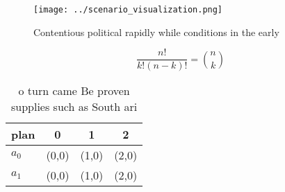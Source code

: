 \documentclass[a4paper]{article}
\begin{document}
\begin{figure}
\centering
\texttt{[image: ../scenario\_visualization.png]}
\caption{Contentious political rapidly while conditions in the early
}
\end{figure}
 
\[ \frac{n!}{k!(n-k)!} = \binom{n}{k} \]

\begin{table}
\begin{adjustbox}{width=0.6\columnwidth}
\begin{tabular}{|l|l|l|l|}
\hline
\textbf{plan} & \multicolumn{1}{c|}{\textbf{0}} & \multicolumn{1}{c|}{\textbf{1}} & \multicolumn{1}{c|}{\textbf{2}} \\ \hline
\textbf{$a_0$}  & (0,0) & (1,0) & (2,0) \\ \hline
\textbf{$a_1$}  & (0,0) & (1,0) & (2,0) \\ \hline
\end{tabular}
\end{adjustbox}
\caption{ o turn came Be proven supplies such as South ari
}
\end{table}
\end{document}
